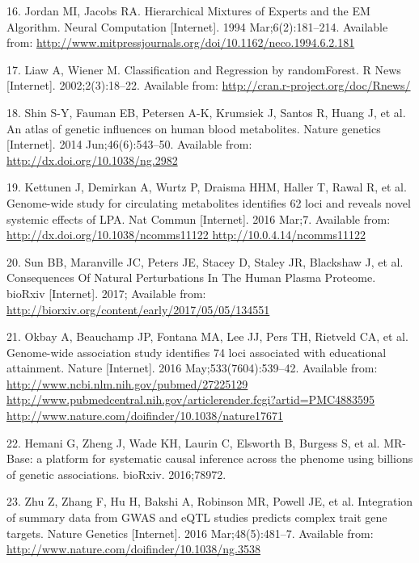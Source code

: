 \documentclass[]{article}
\begin{document}
\hypertarget{ref-Jordan1994}{}
16. Jordan MI, Jacobs RA. Hierarchical Mixtures of Experts and the EM
Algorithm. Neural Computation {[}Internet{]}. 1994 Mar;6(2):181--214.
Available from:
\url{http://www.mitpressjournals.org/doi/10.1162/neco.1994.6.2.181}

\hypertarget{ref-Liaw2002}{}
17. Liaw A, Wiener M. Classification and Regression by randomForest. R
News {[}Internet{]}. 2002;2(3):18--22. Available from:
\url{http://cran.r-project.org/doc/Rnews/}

\hypertarget{ref-Shin2014}{}
18. Shin S-Y, Fauman EB, Petersen A-K, Krumsiek J, Santos R, Huang J, et
al. An atlas of genetic influences on human blood metabolites. Nature
genetics {[}Internet{]}. 2014 Jun;46(6):543--50. Available from:
\url{http://dx.doi.org/10.1038/ng.2982}

\hypertarget{ref-Kettunen2016}{}
19. Kettunen J, Demirkan A, Wurtz P, Draisma HHM, Haller T, Rawal R, et
al. Genome-wide study for circulating metabolites identifies 62 loci and
reveals novel systemic effects of LPA. Nat Commun {[}Internet{]}. 2016
Mar;7. Available from:
\href{http://dx.doi.org/10.1038/ncomms11122\%20http://10.0.4.14/ncomms11122}{http://dx.doi.org/10.1038/ncomms11122 http://10.0.4.14/ncomms11122}

\hypertarget{ref-Sun2017}{}
20. Sun BB, Maranville JC, Peters JE, Stacey D, Staley JR, Blackshaw J,
et al. Consequences Of Natural Perturbations In The Human Plasma
Proteome. bioRxiv {[}Internet{]}. 2017; Available from:
\url{http://biorxiv.org/content/early/2017/05/05/134551}

\hypertarget{ref-Okbay2016}{}
21. Okbay A, Beauchamp JP, Fontana MA, Lee JJ, Pers TH, Rietveld CA, et
al. Genome-wide association study identifies 74 loci associated with
educational attainment. Nature {[}Internet{]}. 2016
May;533(7604):539--42. Available from:
\href{http://www.ncbi.nlm.nih.gov/pubmed/27225129\%20http://www.pubmedcentral.nih.gov/articlerender.fcgi?artid=PMC4883595\%20http://www.nature.com/doifinder/10.1038/nature17671}{http://www.ncbi.nlm.nih.gov/pubmed/27225129 http://www.pubmedcentral.nih.gov/articlerender.fcgi?artid=PMC4883595 http://www.nature.com/doifinder/10.1038/nature17671}

\hypertarget{ref-hemani2016mr}{}
22. Hemani G, Zheng J, Wade KH, Laurin C, Elsworth B, Burgess S, et al.
MR-Base: a platform for systematic causal inference across the phenome
using billions of genetic associations. bioRxiv. 2016;78972.

\hypertarget{ref-Zhu2016}{}
23. Zhu Z, Zhang F, Hu H, Bakshi A, Robinson MR, Powell JE, et al.
Integration of summary data from GWAS and eQTL studies predicts complex
trait gene targets. Nature Genetics {[}Internet{]}. 2016
Mar;48(5):481--7. Available from:
\url{http://www.nature.com/doifinder/10.1038/ng.3538}
\end{document}

